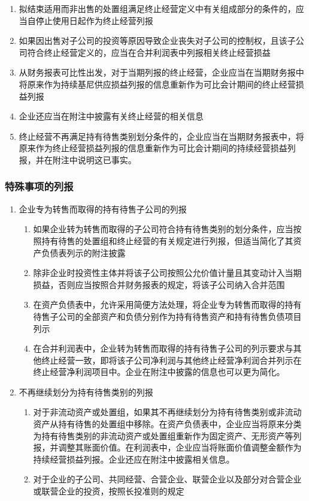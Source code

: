 \documentclass[UTF8,12pt]{ctexart}
\numberwithin{equation}{section} %
\numberwithin{figure}{section}
\numberwithin{table}{section}
\begin{document}
\begin{enumerate}
		\item 拟结束适用而非出售的处置组满足终止经营定义中有关组成部分的条件的，应当自停止使用日起作为终止经营列报
		
		\item 如果因出售对子公司的投资等原因导致企业丧失对子公司的控制权，且该子公司符合终止经营定义的，应当在合并利润表中列报相关终止经营损益
		
		\item 从财务报表可比性出发，对于当期列报的终止经营，企业应当在当期财务报中将原来作为持续基尼供应损益列报的信息重新作为可比会计期间的终止经营损益列报
		
		\item 企业还应当在附注中披露有关终止经营的相关信息
		
		\item 终止经营不再满足持有待售类别划分条件的，企业应当在当期财务报表中，将原来作为终止经营损益列报的信息重新作为可比会计期间的持续经营损益列报，并在附注中说明这已事实。
	\end{enumerate}
	\subsubsection{特殊事项的列报}
	\begin{enumerate}
		\item 企业专为转售而取得的持有待售子公司的列报
		\begin{enumerate}
			\item 如果企业转为转售而取得的子公司符合持有待售类别的划分条件，应当按照持有待售的处置组和终止经营的有关规定进行列报，但适当简化了其资产负债表列示的附注披露
			
			\item 除非企业时投资性主体并将该子公司按照公允价值计量且其变动计入当期损益，否则应当按照合并财务报表的规定，将该子公司纳入合并范围
			
			\item 在资产负债表中，允许采用简便方法处理，将企业专为转售而取得的持有待售子公司的全部资产和负债分别作为持有待售资产和持有待售负债项目列示
			
			\item 在合并利润表中，企业转为转售而取得的持有待售子公司的列示要求与其他终止经营一致，即将该子公司净利润与其他终止经营净利润合并列示在终止经营净利润项目中。企业在附注中披露的信息也可以更为简化。
		\end{enumerate}
		
		\item 不再继续划分为持有待售类别的列报
		\begin{enumerate}
			\item 对于非流动资产或处置组，如果其不再继续划分为持有待售类别或非流动资产从持有待售的处置组中移除。在资产负债表中，企业应当将原来分类为持有待售类别的非流动资产或处置组重新作为固定资产、无形资产等列报，并调整其账面价值。在利润表中，企业应当将账面价值调整金额作为持续经营损益列报。企业还应在附注中披露相关信息。
			
			\item 对于企业的子公司、共同经营、合营企业、联营企业以及部分对合营企业或联营企业的投资，按照长投准则的规定
		\end{enumerate}
	\end{enumerate}
	
\end{document}
